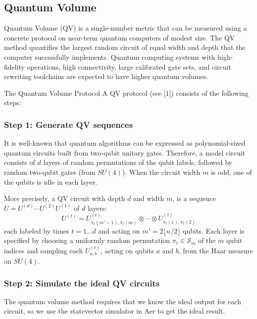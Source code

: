 \documentclass[11pt, oneside]{article}   	%
\begin{document}
\subsection{Quantum Volume}
Quantum Volume (QV) is a single-number metric that can be measured using a concrete protocol on near-term quantum computers of modest size. 
The QV method quantifies the largest random circuit of equal width and depth that the computer successfully implements. 
Quantum computing systems with high-fidelity operations, high connectivity, large calibrated gate sets, and circuit rewriting toolchains are expected to have higher quantum volumes.

The Quantum Volume Protocol
A QV protocol (see [1]) consists of the following steps:

\subsubsection{Step 1: Generate QV sequences}
It is well-known that quantum algorithms can be expressed as polynomial-sized quantum circuits built from two-qubit unitary gates. 
Therefore, a model circuit consists of $d$ layers of random permutations of the qubit labels, followed by random two-qubit gates (from $SU(4)$). 
When the circuit width $m$ is odd, one of the qubits is idle in each layer.

More precisely, a QV circuit with depth $d$ and width $m$, is a sequence $U = U^{(d)} \cdots U^{(2)}U^{(1)}$ of $d$ layers: 
\begin{equation}
U^{(t)} = U^{(t)}_{\pi_t(m'-1),\pi_t(m)} \otimes \cdots \otimes U^{(t)}_{\pi_t(1),\pi_t(2)}
\end{equation}
 each labeled by times $t = 1 ... d$ and acting on $m' = 2 \lfloor n/2 \rfloor$ qubits. Each layer is specified by choosing a uniformly random permutation $\pi_t \in \mathcal{S}_m$ of the $m$ qubit indices and sampling each $U^{(t)}_{a,b}$, acting on qubits $a$ and $b$, from the Haar measure on $SU(4)$.


\subsubsection{Step 2: Simulate the ideal QV circuits}
The quantum volume method requires that we know the ideal output for each circuit, so we use the statevector simulator in Aer to get the ideal result.
\end{document}
